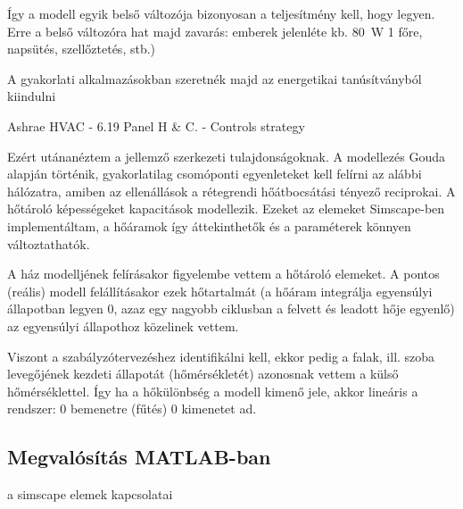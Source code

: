 Így a modell egyik belső változója bizonyosan a teljesítmény kell, hogy legyen. Erre a belső változóra hat majd zavarás: emberek jelenléte kb. \SI{80}{\watt} 1 főre, napsütés, szellőztetés, stb.)

\hrulefill


A gyakorlati alkalmazásokban szeretnék majd az energetikai tanúsítványból kiindulni%


Ashrae HVAC - 6.19 Panel H \& C. - Controls strategy

Ezért utánanéztem a jellemző szerkezeti tulajdonságoknak. A modellezés Gouda alapján történik, gyakorlatilag csomóponti egyenleteket kell felírni az alábbi hálózatra, amiben az ellenállások a rétegrendi hőátbocsátási tényező reciprokai. A hőtároló képességeket kapacitások modellezik. Ezeket az elemeket Simscape-ben implementáltam, a hőáramok így áttekinthetők és a paraméterek könnyen változtathatók.

A ház modelljének felírásakor figyelembe vettem a hőtároló elemeket. A pontos (reális) modell felállításakor ezek hőtartalmát (a hőáram integrálja egyensúlyi állapotban legyen 0, azaz egy nagyobb ciklusban a felvett és leadott hője egyenlő) az egyensúlyi állapothoz közelinek vettem.

Viszont a szabályzótervezéshez identifikálni kell, ekkor pedig a falak, ill. szoba levegőjének kezdeti állapotát (hőmérsékletét) azonosnak vettem a külső hőmérséklettel. Így ha a hőkülönbség a modell kimenő jele, akkor lineáris a rendszer: 0 bemenetre (fűtés) 0 kimenetet ad.

\subsection{Megvalósítás MATLAB-ban}

a simscape elemek kapcsolatai


\pagebreak